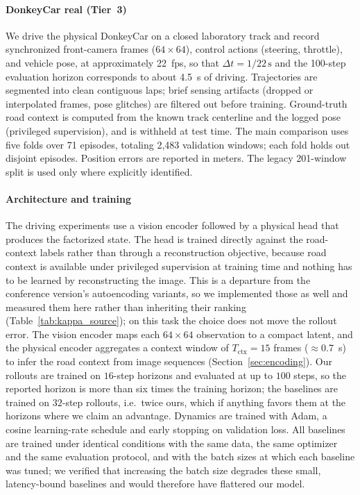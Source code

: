 \documentclass[preprint,12pt]{elsarticle}
\begin{document}
\paragraph{DonkeyCar real (Tier~3)}
We drive the physical DonkeyCar on a closed laboratory track and record
synchronized front-camera frames ($64 \times 64$), control actions
(steering, throttle), and vehicle pose, at approximately \SI{22}{fps}, so that
$\Delta t = 1/22\,\mathrm{s}$ and the 100-step evaluation horizon corresponds to
about \SI{4.5}{s} of driving.
Trajectories are segmented into clean contiguous laps; brief sensing artifacts
(dropped or interpolated frames, pose glitches) are filtered out before training.
Ground-truth road context is computed from the known track centerline and the
logged pose (privileged supervision), and is withheld at test time.
The main comparison uses five folds over 71 episodes, totaling 2{,}483
validation windows; each fold holds out disjoint episodes. Position errors are
reported in meters. The legacy 201-window split is used only where explicitly
identified.

\paragraph{Architecture and training}
The driving experiments use a vision encoder followed by a physical head that
produces the factorized state. The head is trained directly against the road-context
labels rather than through a reconstruction objective, because road context is
available under privileged supervision at training time and nothing has to be
learned by reconstructing the image. This is a departure from the conference
version's autoencoding variants, so we implemented those as well and measured them
here rather than inheriting their ranking (Table~\ref{tab:kappa_source}); on this
task the choice does not move the rollout error.
The vision encoder maps each $64 \times 64$ observation to a compact latent, and
the physical encoder aggregates a context window of $T_{\mathrm{ctx}} = 15$ frames
($\approx$\SI{0.7}{s}) to infer the road context from image sequences
(Section~\ref{sec:encoding}).
Our rollouts are trained on $16$-step horizons and evaluated at up to $100$ steps,
so the reported horizon is more than six times the training horizon; the baselines
are trained on $32$-step rollouts, i.e.\ twice ours, which if anything favors
them at the horizons where we claim an advantage.
Dynamics are trained with Adam, a cosine learning-rate schedule and early stopping
on validation loss.
All baselines are trained under identical conditions with the same data, the same
optimizer and the same evaluation protocol, and with the batch sizes at which each
baseline was tuned; we verified that increasing the batch size degrades these
small, latency-bound baselines and would therefore have flattered our model.
\end{document}
